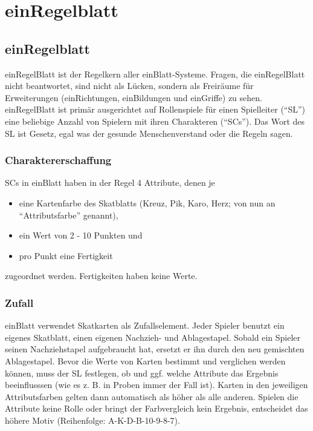 \part {einRegelblatt}
\chapter {einRegelblatt}
einRegelBlatt ist der Regelkern aller einBlatt-Systeme. Fragen, die einRegelBlatt nicht beantwortet, sind nicht als Lücken, sondern als Freiräume für Erweiterungen (einRichtungen, einBildungen und einGriffe) zu sehen. einRegelBlatt ist primär ausgerichtet auf Rollenspiele für einen Spielleiter ("`SL"') eine beliebige Anzahl von Spielern mit ihren Charakteren ("`SCs"'). Das Wort des SL ist Gesetz, egal was der gesunde Menschenverstand oder die Regeln sagen.
\section{Charaktererschaffung}
SCs in einBlatt haben in der Regel 4 Attribute, denen je
\begin{itemize}
\item eine Kartenfarbe des Skatblatts (Kreuz, Pik, Karo, Herz; von nun an "`Attributsfarbe"' genannt),
\item ein Wert von 2 - 10 Punkten und
\item pro Punkt eine Fertigkeit
\end{itemize}
zugeordnet werden. Fertigkeiten haben keine Werte.
\section{Zufall}
einBlatt verwendet Skatkarten als Zufallselement. Jeder Spieler benutzt ein eigenes Skatblatt, einen eigenen Nachzieh- und Ablagestapel. Sobald ein Spieler seinen Nachziehstapel aufgebraucht hat, ersetzt er ihn durch den neu gemischten Ablagestapel. Bevor die Werte von Karten bestimmt und verglichen werden können, muss der SL festlegen, ob und ggf. welche Attribute das Ergebnis beeinflusssen (wie es z. B. in Proben immer der Fall ist). Karten in den jeweiligen Attributsfarben gelten dann automatisch als höher als alle anderen. Spielen die Attribute keine Rolle oder bringt der Farbvergleich kein Ergebnis, entscheidet das höhere Motiv (Reihenfolge: A-K-D-B-10-9-8-7).
